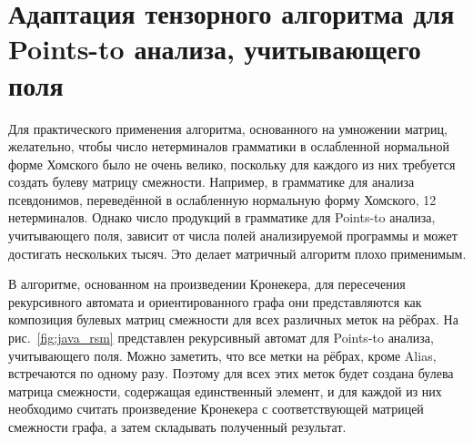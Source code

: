 \section{Адаптация тензорного алгоритма для Points-to анализа, учитывающего поля}

Для практического применения алгоритма, основанного на умножении матриц, желательно, чтобы число нетерминалов грамматики в ослабленной нормальной форме Хомского было не очень велико, поскольку для каждого из них требуется создать булеву матрицу смежности. %
Например, в грамматике для анализа псевдонимов, переведённой в ослабленную нормальную форму Хомского, 12 нетерминалов. Однако число продукций в грамматике для Points-to анализа, учитывающего поля, зависит от числа полей анализируемой программы и может достигать нескольких тысяч. Это делает матричный алгоритм плохо применимым.

В алгоритме, основанном на произведении Кронекера, для пересечения рекурсивного автомата и ориентированного графа они представляются как композиция булевых матриц смежности для всех различных меток на рёбрах. На рис.~\ref{fig:java_rsm} представлен рекурсивный автомат для Points-to анализа, учитывающего поля. Можно заметить, что все метки на рёбрах, кроме Alias, встречаются по одному разу.
Поэтому для всех этих меток будет создана булева матрица смежности, содержащая единственный элемент, и для каждой из них необходимо считать произведение Кронекера с соответствующей матрицей смежности графа, а затем складывать полученный результат.%

